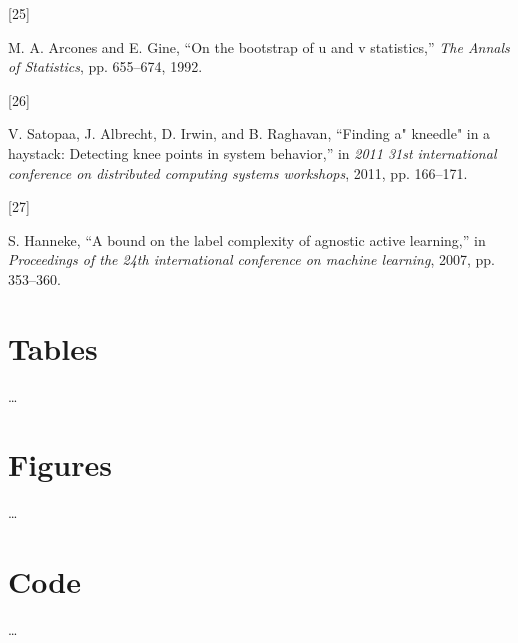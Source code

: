 \documentclass[
  conference]{IEEEtran}
\newlength{\cslhangindent}
\newlength{\csllabelwidth}
\newlength{\cslentryspacingunit} %
\newenvironment{CSLReferences}[2] %
 {%
  \setlength{\parindent}{0pt}
  \ifodd #1
  \let\oldpar\par
  \def\par{\hangindent=\cslhangindent\oldpar}
  \fi
  \setlength{\parskip}{#2\cslentryspacingunit}
 }%
 {}
\newcommand{\CSLLeftMargin}[1]{\parbox[t]{\csllabelwidth}{#1}}
\newcommand{\CSLRightInline}[1]{\parbox[t]{\linewidth - \csllabelwidth}{#1}\break}
\begin{document}
\begin{CSLReferences}{0}{0}
\leavevmode{}%
\CSLLeftMargin{{[}25{]} }%
\CSLRightInline{M. A. Arcones and E. Gine, {``On the bootstrap of u and
v statistics,''} \emph{The Annals of Statistics}, pp. 655--674, 1992.}

\leavevmode{}%
\CSLLeftMargin{{[}26{]} }%
\CSLRightInline{V. Satopaa, J. Albrecht, D. Irwin, and B. Raghavan,
{``Finding a" kneedle" in a haystack: Detecting knee points in system
behavior,''} in \emph{2011 31st international conference on distributed
computing systems workshops}, 2011, pp. 166--171.}

\leavevmode{}%
\CSLLeftMargin{{[}27{]} }%
\CSLRightInline{S. Hanneke, {``A bound on the label complexity of
agnostic active learning,''} in \emph{Proceedings of the 24th
international conference on machine learning}, 2007, pp. 353--360.}

\end{CSLReferences}

\pagebreak

\hypertarget{tables}{%
\section{Tables}\label{tables}}

\ldots{}

\pagebreak

\hypertarget{figures}{%
\section{Figures}\label{figures}}

\ldots{}

\pagebreak

\hypertarget{code}{%
\section{Code}\label{code}}

\ldots{}
\end{document}
